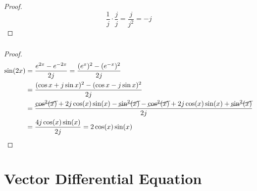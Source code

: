 \documentclass[]{article}
\begin{document}
\begin{proof}
\begin{equation}
	\frac{1}{j} \cdot \frac{j}{j} = \frac{j}{j^2} = -j
\end{equation}
\end{proof}

\subsubsection{}

\begin{proof}
\begin{align}
	\sin(2x) &= \frac{e^{2x} - e^{-2x}}{2j} =  \frac{(e^x)^2 - (e^{-x})^2}{2j} \\
	&= \frac{(\cos{x} + j \sin{x})^2 - (\cos{x} - j \sin{x})^2}{2j} \\
	&= \frac{\cancel{\cos^2(x)} + 2j \cos(x) \sin(x) - \cancel{\sin^2(x)} - \cancel{\cos^2(x)} + 2j \cos(x) \sin(x) + \cancel{\sin^2(x)}}{2j} \\
	&= \frac{4j \cos(x) \sin(x)}{2j} = 2 \cos(x) \sin(x)
\end{align}
\end{proof}

\section{Vector Differential Equation}

\subsection{}
\end{document}
